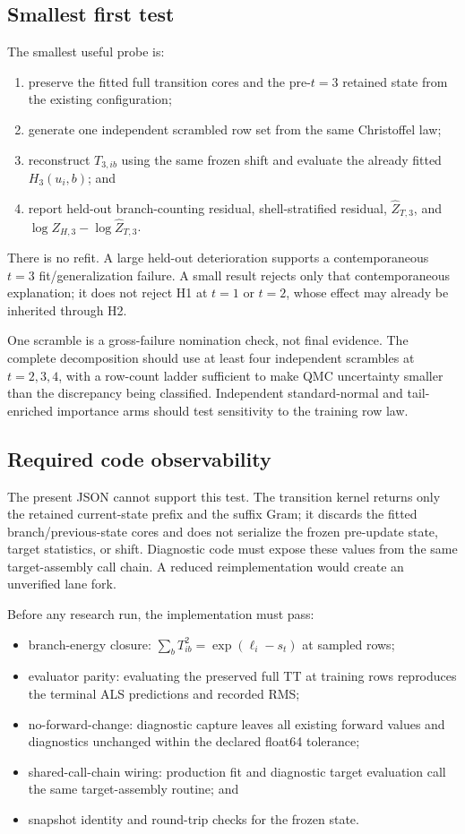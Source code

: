 \documentclass[11pt]{article}
\begin{document}
\subsection{Smallest first test}

The smallest useful probe is:
\begin{enumerate}
\item preserve the fitted full transition cores and the pre-$t=3$ retained
state from the existing configuration;
\item generate one independent scrambled row set from the same Christoffel
law;
\item reconstruct $T_{3,ib}$ using the same frozen shift and evaluate the
already fitted $H_3(u_i,b)$; and
\item report held-out branch-counting residual, shell-stratified residual,
$\widehat Z_{T,3}$, and $\log Z_{H,3}-\log\widehat Z_{T,3}$.
\end{enumerate}
There is no refit. A large held-out deterioration supports a contemporaneous
$t=3$ fit/generalization failure. A small result rejects only that
contemporaneous explanation; it does not reject H1 at $t=1$ or $t=2$, whose
effect may already be inherited through H2.

One scramble is a gross-failure nomination check, not final evidence. The
complete decomposition should use at least four independent scrambles at
$t=2,3,4$, with a row-count ladder sufficient to make QMC uncertainty smaller
than the discrepancy being classified. Independent standard-normal and
tail-enriched importance arms should test sensitivity to the training row law.

\subsection{Required code observability}

The present JSON cannot support this test. The transition kernel returns only
the retained current-state prefix and the suffix Gram; it discards the fitted
branch/previous-state cores and does not serialize the frozen pre-update state,
target statistics, or shift. Diagnostic code must expose these values from the
same target-assembly call chain. A reduced reimplementation would create an
unverified lane fork.

Before any research run, the implementation must pass:
\begin{itemize}
\item branch-energy closure:
$\sum_bT_{ib}^2=\exp(\ell_i-s_t)$ at sampled rows;
\item evaluator parity: evaluating the preserved full TT at training rows
reproduces the terminal ALS predictions and recorded RMS;
\item no-forward-change: diagnostic capture leaves all existing forward values
and diagnostics unchanged within the declared float64 tolerance;
\item shared-call-chain wiring: production fit and diagnostic target
evaluation call the same target-assembly routine; and
\item snapshot identity and round-trip checks for the frozen state.
\end{itemize}
\end{document}

